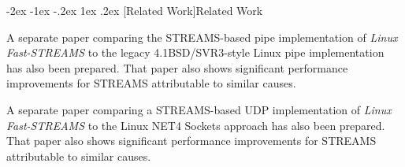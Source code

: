 \documentclass[letterpaper,final,notitlepage,twocolumn,10pt,twoside]{article}
\makeatletter
\let\large = \normalsize
\let\normalsize = \small
\let\small = \footnotesize
\let\footnotesize = \scriptsize
\let\scriptsize = \tiny
\renewcommand\section{\@startsection {section}{1}{\z@}%
                                   {-2ex \@plus -1ex \@minus -.2ex}%
                                   {1ex \@plus .2ex}%
                                   {\normalfont\large\bfseries}}
\makeatother
\begin{document}
\section[Related Work]{Related Work}

A separate paper comparing the STREAMS-based pipe implementation of \textsl{Linux Fast-STREAMS} to
the legacy 4.1BSD/SVR3-style Linux pipe implementation has also been prepared.  That paper also
shows significant performance improvements for STREAMS attributable to similar causes.

A separate paper comparing a STREAMS-based UDP implementation of \textsl{Linux Fast-STREAMS} to the
Linux NET4 Sockets approach has also been prepared.  That paper also shows significant performance
improvements for STREAMS attributable to similar causes.

\FloatBarrier
{}

\end{document}
